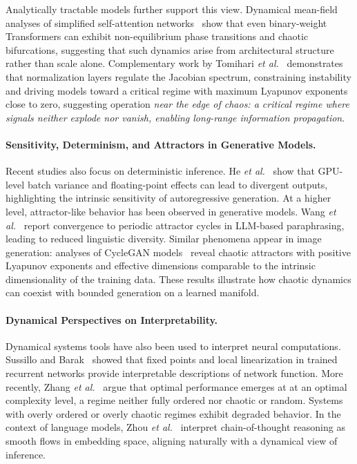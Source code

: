 \documentclass[aip%
 aip,
 amsmath,amssymb,
 reprint,%
]{revtex4-1}
\begin{document}
Analytically tractable models further support this view. Dynamical mean-field analyses of simplified self-attention networks~\cite{dynamicalmeanfieldtheoryselfattention} show that even binary-weight Transformers can exhibit non-equilibrium phase transitions and chaotic bifurcations, suggesting that such dynamics arise from architectural structure rather than scale alone. Complementary work by Tomihari \textit{et al.}~\cite{tomihari2025recurrent_self_attention_dynamics} demonstrates that normalization layers regulate the Jacobian spectrum, constraining instability and driving models toward a critical regime with maximum Lyapunov exponents close to zero, suggesting operation \textit{near the edge of chaos: a critical regime where signals neither explode nor vanish, enabling long-range information propagation}.

\paragraph{Sensitivity, Determinism, and Attractors in Generative Models.}
Recent studies also focus on deterministic inference. He \textit{et al.}~\cite{he2025nondeterminism} show that GPU-level batch variance and floating-point effects can lead to divergent outputs, highlighting the intrinsic sensitivity of autoregressive generation. At a higher level, attractor-like behavior has been observed in generative models. Wang \textit{et al.}~\cite{wang2025unveiling_attractor_cycles} report convergence to periodic attractor cycles in LLM-based paraphrasing, leading to reduced linguistic diversity. Similar phenomena appear in image generation: analyses of CycleGAN models~\cite{cyclegan} reveal chaotic attractors with positive Lyapunov exponents and effective dimensions comparable to the intrinsic dimensionality of the training data. These results illustrate how chaotic dynamics can coexist with bounded generation on a learned manifold.

\paragraph{Dynamical Perspectives on Interpretability.}

Dynamical systems tools have also been used to interpret neural computations. Sussillo and Barak~\cite{sussillo2013} showed that fixed points and local linearization in trained recurrent networks provide interpretable descriptions of network function. More recently, Zhang \textit{et al.}~\cite{zhang2024intelligence_edge_of_chaos} argue that optimal performance emerges at at an optimal complexity level, a regime neither fully ordered nor chaotic or random. Systems with overly ordered or overly chaotic regimes exhibit degraded behavior. In the context of language models, Zhou \textit{et al.}~\cite{zhou2025geometryreasoningflowinglogics} interpret chain-of-thought reasoning as smooth flows in embedding space, aligning naturally with a dynamical view of inference.
\end{document}
